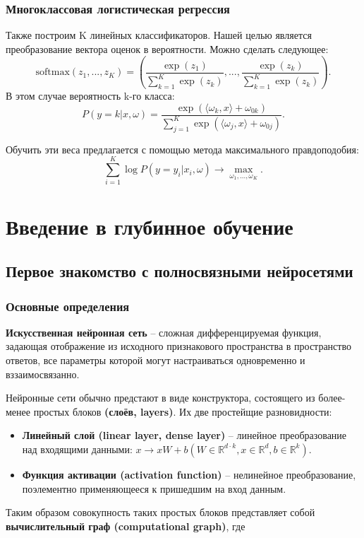 \documentclass[a4paper, 10pt, openany]{book} %
\begin{document}
	\subsection{Многоклассовая логистическая регрессия}
	
	Также построим K линейных классификаторов. Нашей целью является преобразование вектора оценок в вероятности. Можно сделать следующее:
	\begin{equation*}
		\text{softmax}(z_1,...,z_K) = \left(\frac{\exp(z_1)}{\sum_{k=1}^{K}\exp(z_k)},...,\frac{\exp(z_k)}{\sum_{k=1}^{K}\exp(z_k)}\right).
	\end{equation*}
	В этом случае вероятность k-го класса:
	\begin{equation*}
		P(y=k|x,\omega) = \frac{\exp(\langle\omega_k,x\rangle + \omega_{0k})}{\sum_{j=1}^{K}\exp(\langle\omega_j,x\rangle + \omega_{0j})}.
	\end{equation*}
	
	Обучить эти веса предлагается с помощью метода максимального правдоподобия:
	\begin{equation*}
		\sum_{i=1}^{K}\log P(y=y_i|x_i, \omega) \rightarrow \max_{\omega_1,...,\omega_K}.
	\end{equation*}
	
	\chapter{Введение в глубинное обучение}
	
	\section{Первое знакомство с полносвязными нейросетями}
	
	\subsection{Основные определения}
	
	\textbf{Искусственная нейронная сеть} -- сложная дифференцируемая функция, задающая отображение из исходного признакового пространства в пространство ответов, все параметры которой могут настраиваться одновременно и вззаимосвязанно.
	
	Нейронные сети обычно предстают в виде конструктора, состоящего из более-менее простых блоков \textbf{(слоёв, layers)}. Их две простейщие разновидности:
	\begin{itemize}
		\item \textbf{Линейный слой (linear layer, dense layer)} -- линейное преобразование над входящими данными: $x \rightarrow xW + b (W \in \mathbb{R}^{d \cdot k}, x \in \mathbb{R}^d, b \in \mathbb{R}^k)$.
		\item \textbf{Функция активации (activation function)} -- нелинейное преобразование, поэлементно применяющееся к пришедшим на вход данным.
	\end{itemize}
	Таким образом совокупность таких простых блоков представляет собой \textbf{вычислительный граф (computational graph)}, где 
	
\end{document}
